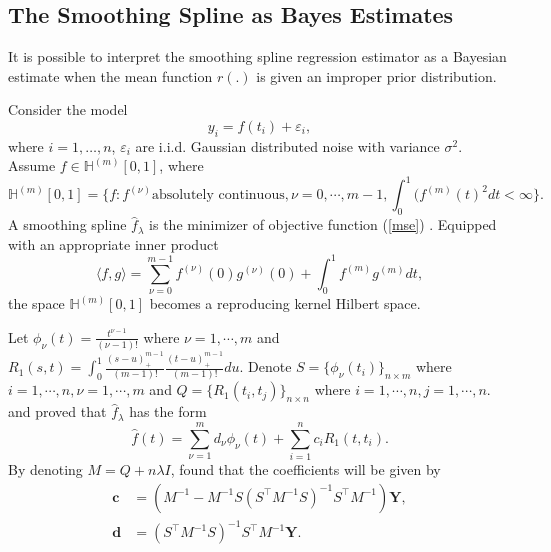 \subsection{The Smoothing Spline as Bayes Estimates}
It is possible to interpret the smoothing spline regression estimator as a Bayesian estimate when the mean function $r( .)$ is given an improper prior distribution. \cite{berlinet2011reproducing}
\cite{wahba1990spline}


Consider the model
\begin{equation}
y_i=f(t_i)+\varepsilon_i, 
\end{equation}
where $i=1, \dots, n$, $\varepsilon_i$ are i.i.d. Gaussian distributed noise with variance $\sigma^2$. Assume $f\in \mathbb{H}^{(m)}[0,1]$, where
\begin{equation}
\mathbb{H}^{(m)}[0,1]=\{f:f^{(\nu)} \mbox{absolutely continuous}, \nu=0,\cdots,m-1, \int_{0}^{1} (f^{(m)}(t)^2dt<\infty \}.
\end{equation}
A smoothing spline $\hat{f}_\lambda$ is the minimizer of objective function (\ref{mse}) \cite{wang1998smoothing}. Equipped with an appropriate inner product
\begin{equation}
\langle f,g\rangle=\sum_{\nu=0}^{m-1}f^{(\nu)}(0)g^{(\nu)}(0)+\int_{0}^{1}f^{(m)}g^{(m)}dt,
\end{equation}
the space $\mathbb{H}^{(m)}[0,1]$ becomes a reproducing kernel Hilbert space.

Let $\phi_\nu (t)=\frac{t^{\nu-1}}{(\nu-1)!}$ where $\nu=1, \cdots, m$ and $R_1(s,t)=\int_0^1\frac{ (s-u)_+^{m-1}}{(m-1)!} \frac{ (t-u)_+^{m-1}}{(m-1)!} du$. Denote $S=\{\phi_\nu (t_i) \}_{n\times m}$ where $i=1, \cdots, n, \nu=1, \cdots, m$ and $Q=\{ R_1(t_i,t_j)\}_{n\times n}$ where $i=1, \cdots, n, j=1, \cdots, n$. \cite{kimeldorf1971some} and \cite{kimeldorf1970correspondence}  proved that $\hat{f}_\lambda$ has the form
\begin{equation}
\hat{f}(t)=\sum_{\nu=1}^m d_\nu \phi_\nu(t)+\sum_{i=1}^n c_iR_1(t,t_i).
\end{equation}
By denoting $M=Q+n\lambda I$, \cite{gubook} found that the coefficients will be given by
\begin{align}
\mathbf{c}&=(M^{-1}-M^{-1}S(S^\top M^{-1}S)^{-1}S^\top M^{-1})\mathbf{Y},\\
\mathbf{d}&=(S^\top M^{-1}S)^{-1}S^\top M^{-1}\mathbf{Y}.
\end{align}


